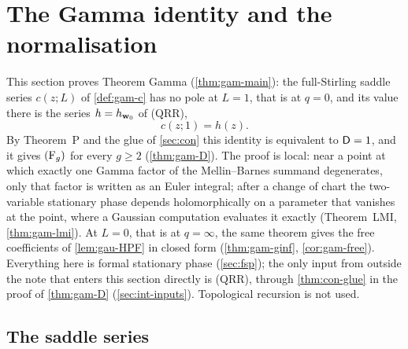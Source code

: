 
\section{The Gamma identity and the normalisation}
\label{sec:gam}

This section proves Theorem Gamma (\cref{thm:gam-main}): the full-Stirling saddle series $c(z;L)$ of \cref{def:gam-c} has no pole at $L=1$, that is at $q=0$, and its value there is the series $h=h_{\mathbf{w}_0}$ of (QRR),
\[
c(z;1)=h(z).
\]
By Theorem~P and the glue of \cref{sec:con} this identity is equivalent to $\mathsf{D}=1$, and it gives $(\mathrm{F}_{g})$ for every $g\geq 2$ (\cref{thm:gam-D}). The proof is local: near a point at which exactly one Gamma factor of the Mellin--Barnes summand degenerates, only that factor is written as an Euler integral; after a change of chart the two-variable stationary phase depends holomorphically on a parameter that vanishes at the point, where a Gaussian computation evaluates it exactly (Theorem~LMI, \cref{thm:gam-lmi}). At $L=0$, that is at $q=\infty$, the same theorem gives the free coefficients of \cref{lem:gau-HPF} in closed form (\cref{thm:gam-ginf}, \cref{cor:gam-free}). Everything here is formal stationary phase (\cref{sec:fsp}); the only input from outside the note that enters this section directly is (QRR), through \cref{thm:con-glue} in the proof of \cref{thm:gam-D} (\cref{sec:int-inputs}). Topological recursion is not used.

\subsection{The saddle series}
\label{sec:gam-series}

